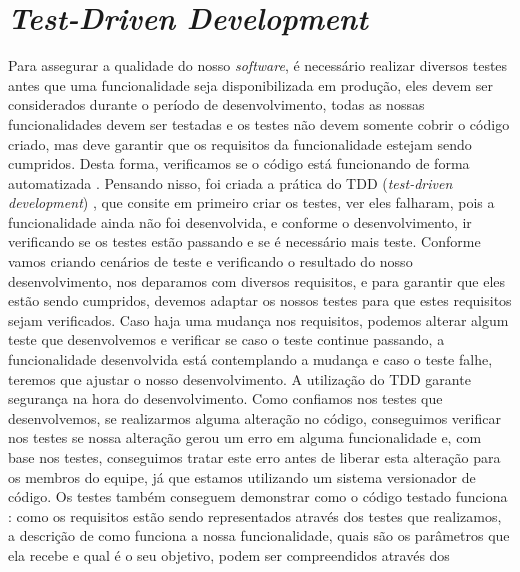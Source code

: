       \section{\textit{Test-Driven Development}}
        Para assegurar a qualidade do nosso \textit{software}, é necessário realizar
        diversos testes antes que uma funcionalidade seja disponibilizada em produção,
        eles devem ser considerados durante o período de desenvolvimento, todas
        as nossas funcionalidades devem ser testadas e os testes não devem somente
        cobrir o código criado, mas deve garantir que os requisitos da funcionalidade
        estejam sendo cumpridos. Desta forma, verificamos se o código está funcionando
        de forma automatizada \cite{CleanCode}. \newline
        Pensando nisso, foi criada a prática do TDD (\textit{test-driven development})
        \cite{TestDrivenDevelopment}, que consite em primeiro criar os testes, ver
        eles falharam, pois a funcionalidade ainda não foi desenvolvida, e conforme
        o desenvolvimento, ir verificando se os testes estão passando e se é necessário
        mais teste. Conforme vamos criando cenários de teste e verificando o resultado
        do nosso desenvolvimento, nos deparamos com diversos requisitos, e para
        garantir que eles estão sendo cumpridos, devemos adaptar os nossos testes para
        que estes requisitos sejam verificados. Caso haja uma mudança nos requisitos,
        podemos alterar algum teste que desenvolvemos e verificar se caso o teste
        continue passando, a funcionalidade desenvolvida está contemplando a mudança
        e caso o teste falhe, teremos que ajustar o nosso desenvolvimento. \newline
        A utilização do TDD garante segurança na hora do desenvolvimento. Como
        confiamos nos testes que desenvolvemos, se realizarmos alguma alteração
        no código, conseguimos verificar nos testes se nossa alteração gerou um
        erro em alguma funcionalidade e, com base nos testes, conseguimos tratar
        este erro antes de liberar esta alteração para os membros do equipe, já
        que estamos utilizando um sistema versionador de código. Os testes também
        conseguem demonstrar como o código testado funciona \cite{martin2007agile}:
        como os requisitos estão sendo representados através dos testes que realizamos,
        a descrição de como funciona a nossa funcionalidade, quais são os parâmetros
        que ela recebe e qual é o seu objetivo, podem ser compreendidos através dos
